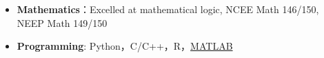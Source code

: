   \begin{itemize}[leftmargin=*]
    \item \textbf{Mathematics}：Excelled at mathematical logic, NCEE Math 146/150, NEEP Math 149/150
    \item \textbf{Programming}: Python，C/C++，R，\href{https://www.mathworks.com/}{MATLAB}
  \end{itemize}